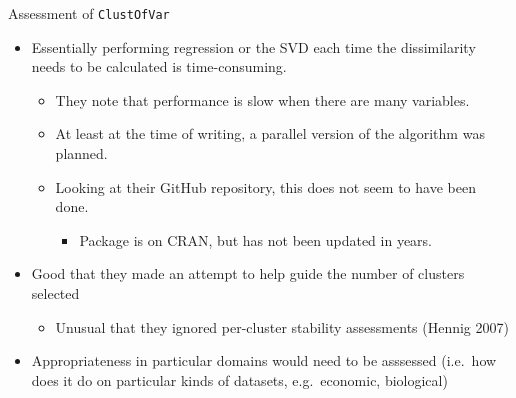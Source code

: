 \documentclass[
  ignorenonframetext,
  aspectratio=169,
]{beamer}
\providecommand{\tightlist}{%
  \setlength{\itemsep}{0pt}\setlength{\parskip}{0pt}}\usepackage{longtable,booktabs,array}
\begin{document}
\begin{frame}{Assessment of \texttt{ClustOfVar}}
\protect\hypertarget{assessment-of-clustofvar}{}
\begin{itemize}
\tightlist
\item
  Essentially performing regression or the SVD each time the
  dissimilarity needs to be calculated is time-consuming.

  \begin{itemize}
  \tightlist
  \item
    They note that performance is slow when there are many variables.
  \item
    At least at the time of writing, a parallel version of the algorithm
    was planned.
  \item
    Looking at their GitHub repository, this does not seem to have been
    done.

    \begin{itemize}
    \tightlist
    \item
      Package is on CRAN, but has not been updated in years.
    \end{itemize}
  \end{itemize}
\item
  Good that they made an attempt to help guide the number of clusters
  selected

  \begin{itemize}
  \tightlist
  \item
    Unusual that they ignored per-cluster stability assessments (Hennig
    2007)
  \end{itemize}
\item
  Appropriateness in particular domains would need to be asssessed
  (i.e.~how does it do on particular kinds of datasets, e.g.~economic,
  biological)
\end{itemize}
\end{frame}
\end{document}

